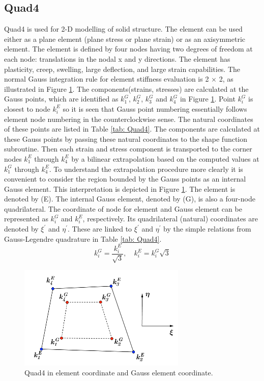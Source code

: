 \subsection{Quad4} \label{Quad4}
Quad4 is used for 2-D modelling of solid structure. The element can be used either as a plane element (plane stress or plane strain) or as an axisymmetric element. The element is defined by four nodes having two degrees of freedom at each node: translations in the nodal x and y directions. The element has plasticity, creep, swelling, large deflection, and large strain capabilities.  The normal Gauss integration rule for element stiffness evaluation is 2 $\times$ 2, as illustrated in Figure \ref{fig: Quad4_1}. The components(strains, stresses) are calculated at the Gauss points, which are identified as $k_1^G$, $k_2^G$, $k_3^G$ and $k_4^G$ in Figure \ref{fig: Quad4_1}. Point $k_i^G$ is closest to node $k_i^E$ so it is seen that Gauss point numbering essentially follows element node numbering in the counterclockwise sense. The natural coordinates of these points are listed in Table \ref{tab: Quad4}. The components are calculated at these Gauss points by passing these natural coordinates to the shape function subroutine. Then each strain and stress component is transported to the corner nodes $k_1^E$ through $k_4^E$ by a bilinear extrapolation based on the computed values at $k_1^G$ through $k_4^E$. To understand the extrapolation procedure more clearly it is convenient to consider the region bounded by the Gauss points as an internal Gauss element. This interpretation is depicted in Figure \ref{fig: Quad4_1}. The element is denoted by (E). The internal Gauss element, denoted by (G), is also a four-node quadrilateral. The coordinate of node for element and Gauss element can be represented as $k_i^G$ and $k_i^E$, respectively. Its quadrilateral (natural) coordinates are denoted by $\xi^{\prime}$ and $\eta^{\prime}$.  These are linked to $\xi^{\prime}$ and $\eta^{\prime}$ by the simple relations from Gauss-Legendre quadrature in Table \ref{tab: Quad4}.
\begin{equation}
k_i^G = \frac{k_i^E}{\sqrt{3}},\quad
k_i^E= k_i^G\sqrt{3}
\end{equation}

\begin{figure}[h]
	\begin{center}
		\includegraphics[width=8cm,clip]{Quad4_1.pdf}			
		\caption{Quad4 in element coordinate and Gauss element coordinate.}	\label{fig: Quad4_1}
	\end{center} 
\end{figure}

